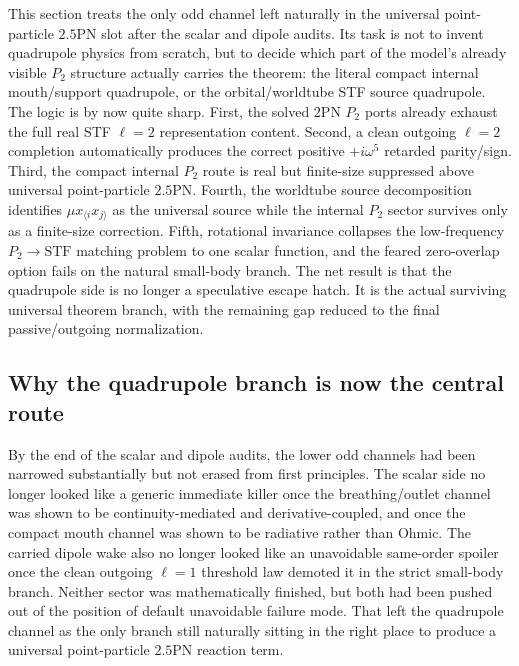\documentclass[11pt]{article}
\begin{document}
This section treats the only odd channel left naturally in the universal
point-particle $2.5$PN slot after the scalar and dipole audits.  Its task is
not to invent quadrupole physics from scratch, but to decide which part of the
model's already visible $P_2$ structure actually carries the theorem: the
literal compact internal mouth/support quadrupole, or the orbital/worldtube STF
source quadrupole.  The logic is by now quite sharp.  First, the solved $2$PN
$P_2$ ports already exhaust the full real STF $\ell=2$ representation content.
Second, a clean outgoing $\ell=2$ completion automatically produces the correct
positive $+i\omega^5$ retarded parity/sign.  Third, the compact internal $P_2$
route is real but finite-size suppressed above universal point-particle
$2.5$PN.  Fourth, the worldtube source decomposition identifies
$\mu x_{\langle i}x_{j\rangle}$ as the universal source while the internal
$P_2$ sector survives only as a finite-size correction.  Fifth, rotational
invariance collapses the low-frequency $P_2\to\mathrm{STF}$ matching problem to
one scalar function, and the feared zero-overlap option fails on the natural
small-body branch.  The net result is that the quadrupole side is no longer a
speculative escape hatch.  It is the actual surviving universal theorem branch,
with the remaining gap reduced to the final passive/outgoing normalization.

\subsection{Why the quadrupole branch is now the central route}
\label{sec:quadrupole-surviving-why-central}

By the end of the scalar and dipole audits, the lower odd channels had been
narrowed substantially but not erased from first principles.  The scalar side no
longer looked like a generic immediate killer once the breathing/outlet channel
was shown to be continuity-mediated and derivative-coupled, and once the compact
mouth channel was shown to be radiative rather than Ohmic.  The carried dipole
wake also no longer looked like an unavoidable same-order spoiler once the clean
outgoing $\ell=1$ threshold law demoted it in the strict small-body branch.
Neither sector was mathematically finished, but both had been pushed out of the
position of default unavoidable failure mode.  That left the quadrupole channel
as the only branch still naturally sitting in the right place to produce a
universal point-particle $2.5$PN reaction term.
\end{document}
